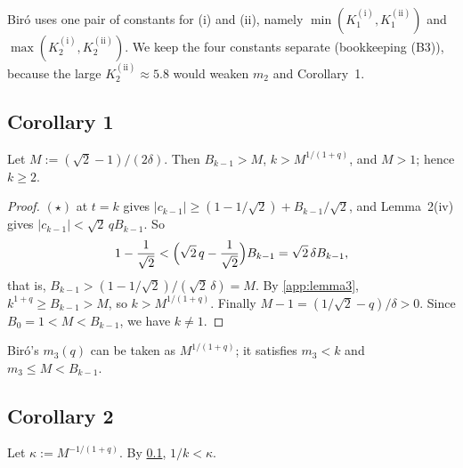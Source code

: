 \documentclass[11pt]{amsart}
\theoremstyle{remark}
\theoremstyle{plain}
\newcommand{\abs}[1]{\lvert #1\rvert}
\newcommand{\Ka}{K_1^{(\mathrm{i})}}
\newcommand{\Kb}{K_2^{(\mathrm{i})}}
\newcommand{\Kc}{K_1^{(\mathrm{ii})}}
\newcommand{\Kd}{K_2^{(\mathrm{ii})}}
\begin{document}
Bir\'o uses one pair of constants for (i) and (ii), namely $\min(\Ka,\Kc)$ and $\max(\Kb,\Kd)$. We keep the four constants separate (bookkeeping (B3)), because the large $\Kd\approx5.8$ would weaken $m_2$ and Corollary~1.

\subsection{Corollary 1}\label{app:cor1}
Let $M:=(\sqrt2-1)/(2\delta)$. Then $B_{k-1}>M$, $k>M^{1/(1+q)}$, and $M>1$; hence $k\ge2$.
\begin{proof}
$(\star)$ at $t=k$ gives $\abs{c_{k-1}}\ge(1-1/\sqrt2)+B_{k-1}/\sqrt2$, and Lemma~2(iv) gives $\abs{c_{k-1}}<\sqrt2\,qB_{k-1}$. So
\[
1-\frac1{\sqrt2}<\Bigl(\sqrt2\,q-\frac1{\sqrt2}\Bigr)B_{k-1}=\sqrt2\,\delta B_{k-1},
\]
that is, $B_{k-1}>(1-1/\sqrt2)/(\sqrt2\,\delta)=M$. By \ref{app:lemma3}, $k^{1+q}\ge B_{k-1}>M$, so $k>M^{1/(1+q)}$. Finally $M-1=(1/\sqrt2-q)/\delta>0$. Since $B_0=1<M<B_{k-1}$, we have $k\ne1$.
\end{proof}
Bir\'o's $m_3(q)$ can be taken as $M^{1/(1+q)}$; it satisfies $m_3<k$ and $m_3\le M<B_{k-1}$.

\subsection{Corollary 2}\label{app:cor2}
Let $\kappa:=M^{-1/(1+q)}$. By \ref{app:cor1}, $1/k<\kappa$.
\end{document}
